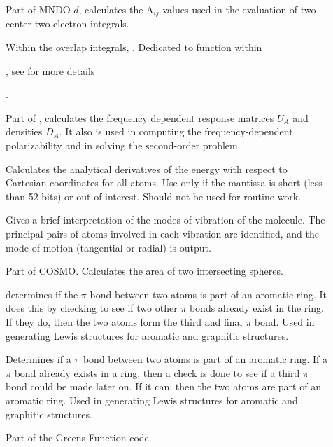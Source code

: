 \begin{description}
\item[] Part of MNDO-$d$,  calculates the A$_{ij}$ values
used in the evaluation of two-center two-electron integrals.

\item[] Within the overlap integrals, .  Dedicated to function  within
\begin{latexonly}
, see \pageref{ab} for more
details
\end{latexonly}.

\item[] Part of ,  calculates the
frequency dependent response matrices $U_A$ and densities $D_A$.  It also is
used in computing the frequency-dependent polarizability and in solving the
second-order problem.

\item[] Calculates the analytical derivatives of the energy with
respect to Cartesian coordinates for all atoms. Use only if the mantissa is
short (less than 52 bits) or out of interest.  Should not be used for routine
work.

\item[] Gives a brief interpretation of the modes of vibration of
the molecule. The principal pairs of atoms  involved in each vibration are
identified, and the mode of motion (tangential or radial) is output.

\item[] Part of COSMO.  Calculates the area of two intersecting 
spheres.

\item[]  determines if the $\pi$ bond between two atoms
is part of an aromatic ring.  It does this by checking to see if two other
$\pi$ bonds already exist in the ring.  If they do, then the two atoms form the
third and final $\pi$ bond. Used in generating Lewis structures for aromatic
and graphitic structures.

\item[] Determines if a $\pi$ bond between two atoms is part of an
aromatic ring.  If a $\pi$ bond already exists in a ring, then a check is done
to see if a third $\pi$ bond could be made later on.  If it can, then the two
atoms are part of an aromatic ring. Used in generating Lewis structures for
aromatic and graphitic structures.

\item[] Part of the Greens Function code.


\end{description}
